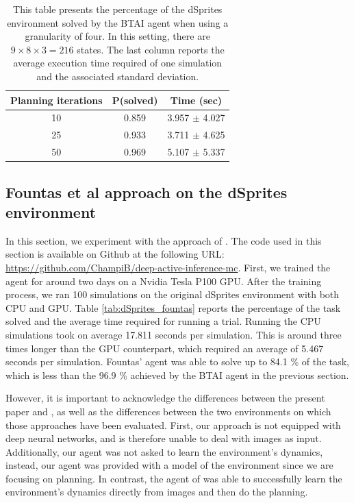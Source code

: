 \documentclass[twoside,11pt]{article}
\begin{document}
\begin{table}[H]
\centering
\begin{tabular}{ |c|c|c| }
 \hline
 Planning iterations & P(solved) & Time (sec) \\
 \hline
 10 & 0.859 & 3.957 $\pm$ 4.027 \\
 \hline
 25 & 0.933 & 3.711 $\pm$ 4.625 \\
 \hline
 50 & 0.969 & 5.107 $\pm$ 5.337 \\
 \hline
\end{tabular}
\caption{This table presents the percentage of the dSprites environment solved by the BTAI agent when using a granularity of four. In this setting, there are $9 \times 8 \times 3 = 216$ states. The last column reports the average execution time required of one simulation and the associated standard deviation.}
\label{tab:dSprites_res_4}
\end{table}

\subsection{Fountas et al approach on the dSprites environment}

In this section, we experiment with the approach of \citet{DeepAIwithMCMC}. The code used in this section is available on Github at the following URL: \url{https://github.com/ChampiB/deep-active-inference-mc}. First, we trained the agent for around two days on a Nvidia Tesla P100 GPU. After the training process, we ran 100 simulations on the original dSprites environment with both CPU and GPU. Table \ref{tab:dSprites_fountas} reports the percentage of the task solved and the average time required for running a trial. Running the CPU simulations took on average 17.811 seconds per simulation. This is around three times longer than the GPU counterpart, which required an average of 5.467 seconds per simulation. Fountas' agent was able to solve up to 84.1 \% of the task, which is less than the 96.9 \% achieved by the BTAI agent in the previous section.

However, it is important to acknowledge the differences between the present paper and \citet{DeepAIwithMCMC}, as well as the differences between the two environments on which those approaches have been evaluated. First, our approach is not equipped with deep neural networks, and is therefore unable to deal with images as input. Additionally, our agent was not asked to learn the environment's dynamics, instead, our agent was provided with a model of the environment since we are focusing on planning. In contrast, the agent of \citet{DeepAIwithMCMC} was able to successfully learn the environment's dynamics directly from images and then do the planning.
\end{document}
